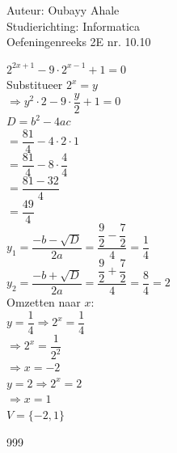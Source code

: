 \documentclass[a4paper]{article}
\begin{document}
  
\noindent \large Auteur: Oubayy Ahale          \\
\noindent \large Studierichting: Informatica   \\
\noindent \large Oefeningenreeks 2E nr. 10.10  \\

\medskip

\normalsize

$ 2^{2x+1} - 9 \cdot 2^{x-1} + 1 = 0 $\\

Substitueer $ 2^x = y $\\

$ \Rightarrow y^2 \cdot 2 - 9 \cdot \dfrac{y}{2} + 1 = 0 $\\

$ D = b^2 - 4ac $\\

$ = \dfrac{81}{4} - 4 \cdot 2 \cdot 1 $\\

$ = \dfrac{81}{4} - 8 \cdot \dfrac{4}{4} $\\

$ = \dfrac{81 - 32}{4} $\\

$ = \dfrac{49}{4} $\\

$ y_1 = \dfrac{-b - \sqrt{D}}{2a} = \dfrac{\dfrac{9}{2} - \dfrac{7}{2}}{4} = \dfrac{1}{4} $\\

$ y_2 = \dfrac{-b + \sqrt{D}}{2a} = \dfrac{\dfrac{9}{2} + \dfrac{7}{2}}{4} = \dfrac{8}{4} = 2 $\\

Omzetten naar $ x $: \\

$ y = \dfrac{1}{4} \Rightarrow 2^x = \dfrac{1}{4} $\\

$ \Rightarrow 2^x = \dfrac{1}{2^2} $\\

$ \Rightarrow x = -2 $\\

$ y = 2 \Rightarrow 2^x = 2 $\\

$ \Rightarrow x = 1 $\\

$ V = \{ -2, 1 \} $\\

\begin{thebibliography}{999}
\end{thebibliography}
\end{document}
